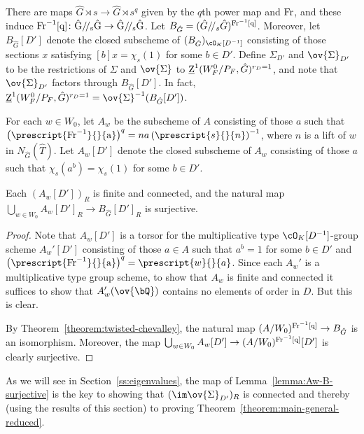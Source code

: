 There are maps $\hat{G} \rtimes s \to \hat{G} \rtimes s^q$ given by the $q$th power map and $\rm{Fr}$, and these induce $\rm{Fr}^{-1}[q]\colon \hat{G}/\!/_s \hat{G} \to \hat{G}/\!/_s \hat{G}$. Let $B_{\hat{G}} = (\hat{G}/\!/_s \hat{G})^{\rm{Fr}^{-1}[q]}$. Moreover, let $B_{\hat{G}}[D']$ denote the closed subscheme of $(B_{\hat{G}})_{\cO_K[D^{-1}]}$ consisting of those sections $x$ satisfying $[b]x = \chi_s(1)$ for some $b \in D'$. Define $\Sigma_{D'}$ and $\ov{\Sigma}_{D'}$ to be the restrictions of $\Sigma$ and $\ov{\Sigma}$ to $\underline{\rm{Z}}^1(W_F^0/P_F, \hat{G})^{r_D = 1}$, and note that $\ov{\Sigma}_{D'}$ factors through $B_{\hat{G}}[D']$. In fact, $\underline{\rm{Z}}^1(W_F^0/P_F, \hat{G})^{r_D = 1} = \ov{\Sigma}^{-1}(B_{\hat{G}}[D'])$.\smallskip

For each $w \in W_0$, let $A_w$ be the subscheme of $A$ consisting of those $a$ such that $\left(\prescript{\rm{Fr}^{-1}}{}{a}\right)^q = na\left(\prescript{s}{}{n}\right)^{-1}$, where $n$ is a lift of $w$ in $N_{\hat{G}}(\hat{T})$. Let $A_w[D']$ denote the closed subscheme of $A_w$ consisting of those $a$ such that $\chi_s(a^b) = \chi_s(1)$ for some $b \in D'$.

\begin{lemma}\label{lemma:Aw-B-surjective}
    Each $(A_w[D'])_R$ is finite and connected, and the natural map $\bigcup_{w \in W_0} A_w[D']_R \to B_{\hat{G}}[D']_R$ is surjective.
\end{lemma}

\begin{proof}
    Note that $A_w[D']$ is a torsor for the multiplicative type $\cO_K[D^{-1}]$-group scheme $A_w'[D']$ consisting of those $a \in A$ such that $a^b = 1$ for some $b \in D'$ and $\left(\prescript{\rm{Fr}^{-1}}{}{a}\right)^q = \prescript{w}{}{a}$. Since each $A_w'$ is a multiplicative type group scheme, to show that $A_w$ is finite and connected it suffices to show that $A_w'(\ov{\bQ})$ contains no elements of order in $D$. But this is clear.\smallskip
    
    By Theorem~\ref{theorem:twisted-chevalley}, the natural map $(A/W_0)^{\rm{Fr}^{-1}[q]} \to B_{\hat{G}}$ is an isomorphism. Moreover, the map $\bigcup_{w \in W_0} A_w[D'] \to (A/W_0)^{\rm{Fr}^{-1}[q]}[D']$ is clearly surjective.
\end{proof}

As we will see in Section~\ref{ss:eigenvalues}, the map of Lemma~\ref{lemma:Aw-B-surjective} is the key to showing that $(\im \ov{\Sigma}_{D'})_R$ is connected and thereby (using the results of this section) to proving Theorem~\ref{theorem:main-general-reduced}.

